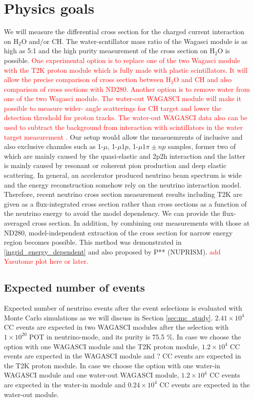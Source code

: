 \section{Physics goals}
We will measure the differential cross section for the charged current interaction on $\mathrm{H_2O}$ and/or CH.
The water-scntillator mass ratio of the Wagasci module is as high as 5:1 and the high purity measurement
of the cross section on $\mathrm{H_2O}$ is possible.
\textcolor{red}{One experimental option is to replace one of the two Wagasci module with the T2K proton module
  which is fully made with plastic scintillators. It will allow the precise comparison
  of cross section between $\mathrm{H_2O}$ and CH and also comparison of cross sections with ND280.}
  \textcolor{red}{Another option is to remove water from one of the two Wagasci module. 
The water-out WAGASCI module will make it possible to measure wider- angle scatterings for CH target and lower the detection threshold for proton tracks.
The water-out WAGASCI data also can be used to subtract the background from interaction with scintillators in the water target measurement .
}
Our setup would allow the measuemrents of inclusive and also exclusive channles such as
1-$\mu$, 1-$\mu 1p$, 1-$\mu 1\pi{\pm} np$ samples, former two of which are mainly caused by the quasi-elastic and
2p2h interaction and the latter is mainly caused by resonant or coherent pion production and deep elastic scattering.
In general, an accelerator produced neutrino beam spectrum is wide and the energy reconstruction
somehow rely on the neutrino interaction model.
Therefore, recent neutrino cross section measurement results including T2K are given as a flux-integrated cross section
rather than cross sections as a function of the neutrino energy to avoid the model dependency.
We can provide the flux-averaged cross section.
In addition, by combining our measurements with those at ND280, model-independent extraction of the cross section
for narrow energy region becomes possible.
This method was demonstrated in \ref{ingrid_energy_dependent} and also proposed by P** (NUPRISM).
\textcolor{red}{add Yasutome plot here or later.}


\subsection{Expected number of events}
Expected number of neutrino events after the event selections is evaluated with Monte Carlo simulations as we will discuss in Section \ref{sec:mc_study}.
$2.41 \times 10^{4}$ CC events are expected in two WAGASCI modules after the selection with $1\times 10^{20}$ POT in neutrino-mode, and its purity is 75.5 \%.
In case we choose the option with one WAGASCI module and the T2K proton module,  $1.2 \times 10^{4}$ CC events are expected in the WAGASCI module and ? CC events are expected in the T2K proton module.
In case we choose the option with one water-in WAGASCI module and one water-out WAGASCI module,  $1.2 \times 10^{4}$ CC events are expected in the water-in module and $0.24 \times 10^{4}$ CC events are expected in the water-out module.

